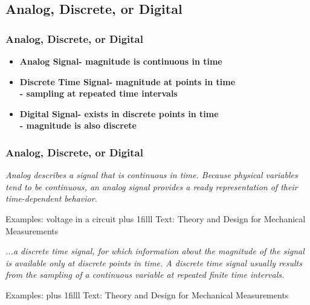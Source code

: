 \documentclass[fleqn]{beamer} %
\newcommand{\sectionIsubsectionIItitle}{Analog, Discrete, or Digital}
\newcommand{\btVFill}{\vskip0pt plus 1filll}
\begin{document}
		\subsection{\sectionIsubsectionIItitle}\label{sectionIsubsectionII}

			\begin{frame}
				\frametitle{\sectionIsubsectionIItitle}

					    \begin{itemize}
			\item \textbf{Analog Signal- magnitude is continuous in time }  \vspace{3mm} \\
			\item \textbf{Discrete Time Signal- magnitude at points in time}  \vspace{3mm} \\
			\textbf{ \hspace*{15mm} - sampling at repeated time intervals}  \vspace{3mm} \\
			\item \textbf{Digital Signal- exists in discrete points in time}  \vspace{3mm} \\
			\textbf{ \hspace*{15mm} - magnitude is also discrete}  \vspace{3mm} \\
		\end{itemize}



			\end{frame}

			\begin{frame}
				\frametitle{\sectionIsubsectionIItitle}


		{\it {\RD Analog} describes a signal that is
		continuous in time. Because physical variables tend to be continuous, an analog signal provides a
		ready representation of their time-dependent behavior. }

		\vspace{30mm}
		Examples: voltage in a circuit
		\btVFill
		\tiny{Text: Theory and Design for Mechanical Measurements}	
				


			\end{frame}


			\begin{frame}

						\bigskip  
			
		{\it ...a {\GR discrete time} signal, for which information about the
		magnitude of the signal is available only at discrete points in time. A discrete time signal usually
		results from the sampling of a continuous variable at repeated finite time intervals. }

		\vspace{30mm}
		Examples:
		\btVFill
		\tiny{Text: Theory and Design for Mechanical Measurements}	

			\end{frame}
\end{document}
